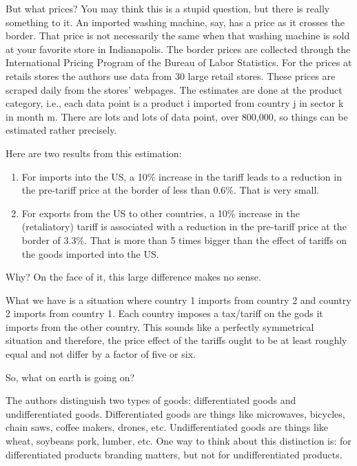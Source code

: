\documentclass[
]{book}
\begin{document}
But what prices? You may think this is a stupid question, but there is really something to it. An imported washing machine, say, has a price as it crosses the border. That price is not necessarily the same when that washing machine is sold at your favorite store in Indianapolis. The border prices are collected through the International Pricing Program of the Bureau of Labor Statistics. For the prices at retails stores the authors use data from 30 large retail stores. These prices are scraped daily from the stores' webpages. The estimates are done at the product category, i.e., each data point is a product i imported from country j in sector k in month m. There are lots and lots of data point, over 800,000, so things can be estimated rather precisely.

Here are two results from this estimation:

\begin{enumerate}
\def\labelenumi{\arabic{enumi}.}
\item
  For imports into the US, a 10\% increase in the tariff leads to a reduction in the pre-tariff price at the border of less than 0.6\%. That is very small.
\item
  For exports from the US to other countries, a 10\% increase in the (retaliatory) tariff is associated with a reduction in the pre-tariff price at the border of 3.3\%. That is more than 5 times bigger than the effect of tariffs on the goods imported into the US.
\end{enumerate}

Why? On the face of it, this large difference makes no sense.

What we have is a situation where country 1 imports from country 2 and country 2 imports from country 1. Each country imposes a tax/tariff on the gods it imports from the other country. This sounds like a perfectly symmetrical situation and therefore, the price effect of the tariffs ought to be at least roughly equal and not differ by a factor of five or six.

So, what on earth is going on?

The authors distinguish two types of goods: differentiated goods and undifferentiated goods. Differentiated goods are things like microwaves, bicycles, chain saws, coffee makers, drones, etc. Undifferentiated goods are things like wheat, soybeans pork, lumber, etc. One way to think about this distinction is: for differentiated products branding matters, but not for undifferentiated products.
\end{document}
